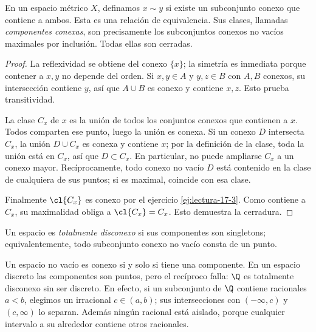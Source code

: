 \begin{proposicion}\label{ch18:componentes}
En un espacio métrico $X$, definamos $x\sim y$ si existe un subconjunto conexo que contiene a ambos. Esta es una relación de equivalencia. Sus clases, llamadas \emph{componentes conexas}, son precisamente los subconjuntos conexos no vacíos maximales por inclusión. Todas ellas son cerradas.
\end{proposicion}
\begin{proof}
La reflexividad se obtiene del conexo $\{x\}$; la simetría es inmediata porque contener a $x,y$ no depende del orden. Si $x,y\in A$ y $y,z\in B$ con $A,B$ conexos, su intersección contiene $y$, así que $A\cup B$ es conexo y contiene $x,z$. Esto prueba transitividad.

La clase $C_x$ de $x$ es la unión de todos los conjuntos conexos que contienen a $x$. Todos comparten ese punto, luego la unión es conexa. Si un conexo $D$ intersecta $C_x$, la unión $D\cup C_x$ es conexa y contiene $x$; por la definición de la clase, toda la unión está en $C_x$, así que $D\subset C_x$. En particular, no puede ampliarse $C_x$ a un conexo mayor. Recíprocamente, todo conexo no vacío $D$ está contenido en la clase de cualquiera de sus puntos; si es maximal, coincide con esa clase.

Finalmente $\cl{C_x}$ es conexo por el ejercicio \ref{ej:lectura-17-3}. Como contiene a $C_x$, su maximalidad obliga a $\cl{C_x}=C_x$. Esto demuestra la cerradura.
\end{proof}

\begin{definicion}
Un espacio es \emph{totalmente disconexo} si sus componentes son singletons; equivalentemente, todo subconjunto conexo no vacío consta de un punto.
\end{definicion}
Un espacio no vacío es conexo si y solo si tiene una componente. En un espacio discreto las componentes son puntos, pero el recíproco falla: $\Q$ es totalmente disconexo sin ser discreto. En efecto, si un subconjunto de $\Q$ contiene racionales $a<b$, elegimos un irracional $c\in(a,b)$; sus intersecciones con $(-\infty,c)$ y $(c,\infty)$ lo separan. Además ningún racional está aislado, porque cualquier intervalo a su alrededor contiene otros racionales.

